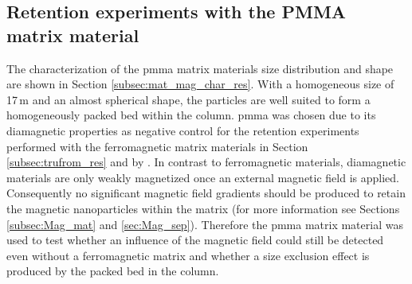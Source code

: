 \subsection{Retention experiments with the PMMA matrix material}
\label{subsec:pmma_res}
The characterization of the \gls{pmma} matrix materials size distribution and shape are shown in Section \ref{subsec:mat_mag_char_res}. With a homogeneous size of 17\,\textmu m and an almost spherical shape, the particles are well suited to form a homogeneously packed bed within the column. \gls{pmma} was chosen due to its diamagnetic properties \cite{wapler2014magnetic} as negative control for the retention experiments performed with the ferromagnetic matrix materials in Section\,\ref{subsec:trufrom_res} and by \cite{AndreMaster}. In contrast to ferromagnetic materials, diamagnetic materials are only weakly magnetized once an external magnetic field is applied. Consequently no significant magnetic field gradients should be produced to retain the magnetic nanoparticles within the matrix (for more information see Sections\,\ref{subsec:Mag_mat} and \ref{sec:Mag_sep}). Therefore the \gls{pmma} matrix material was used to test whether an influence of the magnetic field could still be detected even without a ferromagnetic matrix and whether a size exclusion effect is produced by the packed bed in the column. 

